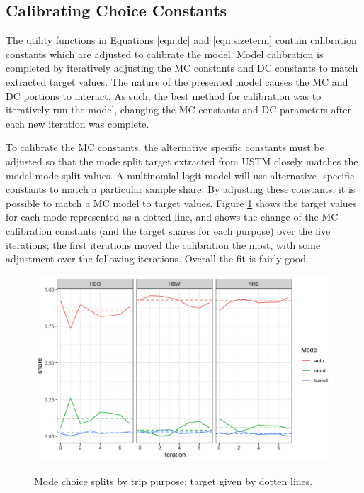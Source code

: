\subsection{Calibrating Choice Constants}

The utility functions in Equations \ref{eqn:dc} and \ref{eqn:sizeterm} contain
calibration constants which are adjusted to calibrate the model. Model
calibration is completed by iteratively adjusting the MC
constants and DC constants to match extracted target values. The nature
of the presented model causes the MC and DC portions to interact. As such,
the best method for calibration was to iteratively run the model, changing
the MC constants and DC parameters after each new iteration was complete.

To calibrate the MC constants, the alternative specific constants must be
adjusted so that the mode split target extracted from USTM closely matches the
model mode split values. A multinomial logit model will use alternative-
specific constants to match a particular sample share. By adjusting these
constants, it is possible to match a MC model to target values.
Figure \ref{fig:nhbmc} shows the target values for each mode represented as a
dotted line, and shows the change of the MC calibration constants
(and the target shares for each purpose) over the five iterations;
the first iterations moved the calibration the most, with some adjustment
over the following iterations. Overall the fit is fairly good.

  \begin{figure}
  {\centering \includegraphics[width=0.75\linewidth]{figures/chapter3/MC_split.png}
  }
  \caption{Mode choice splits by trip purpose; target given by dotten lines.}\label{fig:nhbmc}
  \end{figure}

